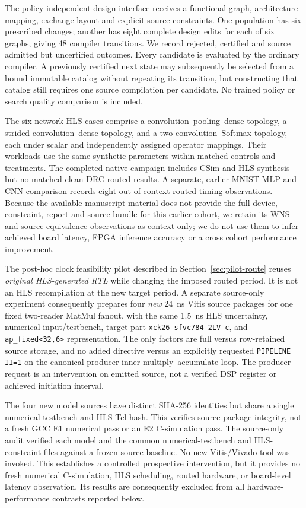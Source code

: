 \documentclass{article}
\begin{document}
The policy-independent design interface receives a functional graph, architecture mapping, exchange layout and explicit source constraints. One population has six prescribed changes; another has eight complete design edits for each of six graphs, giving 48 compiler transitions. We record rejected, certified and source admitted but uncertified outcomes. Every candidate is evaluated by the ordinary compiler. A previously certified next state may subsequently be selected from a bound immutable catalog without repeating its transition, but constructing that catalog still requires one source compilation per candidate. No trained policy or search quality comparison is included.


The six network HLS cases comprise a convolution--pooling--dense topology, a strided-convolution--dense topology, and a two-convolution--Softmax topology, each under scalar and independently assigned operator mappings. Their workloads use the same synthetic parameters within matched controls and treatments. The completed native campaign includes CSim and HLS synthesis but no matched clean-DRC routed results. A separate, earlier MNIST MLP and CNN comparison records eight out-of-context routed timing observations. Because the available manuscript material does not provide the full device, constraint, report and source bundle for this earlier cohort, we retain its WNS and source equivalence observations as context only; we do not use them to infer achieved board latency, FPGA inference accuracy or a cross cohort performance improvement.


The post-hoc clock feasibility pilot described in Section~\ref{sec:pilot-route} reuses \emph{original HLS-generated RTL} while changing the imposed routed period. It is not an HLS recompilation at the new target period. A separate source-only experiment consequently prepares four \emph{new} 24~ns Vitis source packages for one fixed two-reader MatMul fanout, with the same 1.5~ns HLS uncertainty, numerical input/testbench, target part \texttt{xck26-sfvc784-2LV-c}, and \texttt{ap\_fixed<32,6>} representation. The only factors are full versus row-retained source storage, and no added directive versus an explicitly requested \texttt{PIPELINE II=1} on the canonical producer inner multiply--accumulate loop. The producer request is an intervention on emitted source, not a verified DSP register or achieved initiation interval.

The four new model sources have distinct SHA-256 identities but share a single numerical testbench and HLS Tcl hash. This verifies source-package integrity, not a fresh GCC E1 numerical pass or an E2 C-simulation pass. The source-only audit verified each model and the common numerical-testbench and HLS-constraint files against a frozen source baseline. No new Vitis/Vivado tool was invoked. This establishes a controlled prospective intervention, but it provides no fresh numerical C-simulation, HLS scheduling, routed hardware, or board-level latency observation. Its results are consequently excluded from all hardware-performance contrasts reported below.
\end{document}
